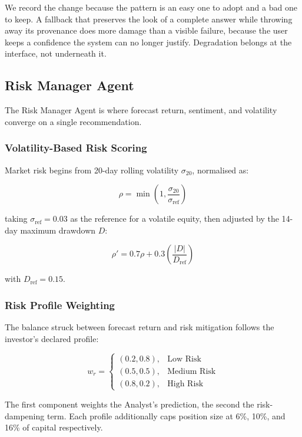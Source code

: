 \documentclass[conference]{IEEEtran}
\begin{document}
We record the change because the pattern is an easy one to adopt and a bad one to keep. A fallback that preserves the look of a complete answer while throwing away its provenance does more damage than a visible failure, because the user keeps a confidence the system can no longer justify. Degradation belongs at the interface, not underneath it.

\subsection{Risk Manager Agent}

The Risk Manager Agent is where forecast return, sentiment, and volatility converge on a single recommendation.

\subsubsection{Volatility-Based Risk Scoring}

Market risk begins from 20-day rolling volatility $\sigma_{20}$, normalised as:

\begin{equation}
\rho = \min\left(1, \frac{\sigma_{20}}{\sigma_{\mathrm{ref}}}\right)
\end{equation}

taking $\sigma_{\mathrm{ref}}=0.03$ as the reference for a volatile equity, then adjusted by the 14-day maximum drawdown $D$:

\begin{equation}
\rho' = 0.7\rho + 0.3\left(\frac{|D|}{D_{\mathrm{ref}}}\right)
\end{equation}

with $D_{\mathrm{ref}}=0.15$.

\subsubsection{Risk Profile Weighting}

The balance struck between forecast return and risk mitigation follows the investor's declared profile:

\[
w_r =
\begin{cases}
(0.2, 0.8), & \text{Low Risk} \\
(0.5, 0.5), & \text{Medium Risk} \\
(0.8, 0.2), & \text{High Risk}
\end{cases}
\]

The first component weights the Analyst's prediction, the second the risk-dampening term. Each profile additionally caps position size at 6\%, 10\%, and 16\% of capital respectively.
\end{document}
